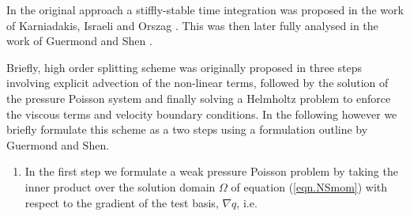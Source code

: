 In the original approach a stiffly-stable time integration was
proposed in the work of Karniadakis, Israeli and Orszag
\cite{KaIsOr91}. This was then later fully analysed in the work of
Guermond and Shen \cite{GuSh03}.

Briefly, high order splitting scheme was originally proposed in three steps involving explicit advection of the non-linear terms, followed by the solution of the pressure Poisson system and finally solving a Helmholtz problem to enforce the viscous terms and velocity boundary conditions. In the following however we briefly formulate this scheme as a two steps using a formulation outline by Guermond and Shen. 

\begin{enumerate}
\item In the first step we formulate a weak pressure Poisson problem
  by taking the inner product over the solution domain $\Omega$ of
  equation (\ref{eqn.NSmom}) with respect to the gradient of the test
  basis, $\nabla q$, i.e.


\end{enumerate}
